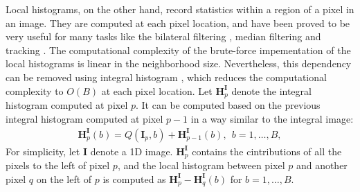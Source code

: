 \documentclass[10pt,twocolumn,letterpaper]{article}
\begin{document}
Local histograms, on the other hand, record statistics within a region of a pixel in an image. They are computed at each pixel location, and have been proved to be very useful for many tasks like the bilateral filtering \cite{time}, median filtering \cite{time,Smoothed} and tracking \cite{Integral,Robust}. The computational complexity of the brute-force impementation of the local histograms is linear in the neighborhood size. Nevertheless, this dependency can be removed using integral histogram \cite{Integral}, which reduces the computational complexity to $O(B)$ at each pixel location. Let $\mathbf{H}_p^{\mathbf{I}}$ denote the integral histogram computed at pixel $p$. It can be computed based on the previous integral histogram computed at pixel $p-1$ in a way similar to the integral image:
\begin{gather}
\mathbf{H}_p^{\mathbf{I}}(b) = Q(\mathbf{I}_p,b) + \mathbf{H}_{p-1}^{\mathbf{I}}(b),~~b = 1,\dots,B,
\end{gather}
For simplicity, let $\mathbf{I}$ denote a 1D image. $\mathbf{H}_p^{\mathbf{I}}$ contains the cintributions of all the pixels to the left of pixel $p$, and the local histogram between pixel $p$ and another pixel $q$ on the left of $p$ is computed as $\mathbf{H}_p^{\mathbf{I}} - \mathbf{H}_q^{\mathbf{I}}(b)$ for $b = 1,\dots,B$.
\end{document}
